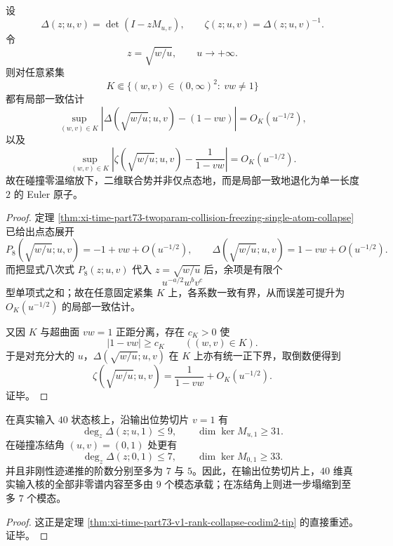 \begin{theorem}[二维联合势的局部一致原子化]\label{thm:conclusion-realinput40-twoparam-local-uniform-atomicization}
设
\[
\Delta(z;u,v)=\det(I-zM_{u,v}),
\qquad
\zeta(z;u,v)=\Delta(z;u,v)^{-1}.
\]
令
\[
z=\sqrt{w/u},
\qquad
u\to+\infty.
\]
则对任意紧集
\[
K\Subset\{(w,v)\in(0,\infty)^2:\ vw\neq 1\}
\]
都有局部一致估计
\[
\sup_{(w,v)\in K}
\left|
\Delta\!\left(\sqrt{w/u};u,v\right)-(1-vw)
\right|
=
O_K(u^{-1/2}),
\]
以及
\[
\sup_{(w,v)\in K}
\left|
\zeta\!\left(\sqrt{w/u};u,v\right)-\frac{1}{1-vw}
\right|
=
O_K(u^{-1/2}).
\]
故在碰撞零温缩放下，二维联合势并非仅点态地，而是局部一致地退化为单一长度 \(2\) 的 Euler 原子。
\end{theorem}
\begin{proof}
定理 \ref{thm:xi-time-part73-twoparam-collision-freezing-single-atom-collapse} 已给出点态展开
\[
P_8\!\left(\sqrt{w/u};u,v\right)=-1+vw+O(u^{-1/2}),
\qquad
\Delta\!\left(\sqrt{w/u};u,v\right)=1-vw+O(u^{-1/2}).
\]
而把显式八次式 \(P_8(z;u,v)\) 代入 \(z=\sqrt{w/u}\) 后，余项是有限个
\[
u^{-a/2}w^bv^c
\]
型单项式之和；故在任意固定紧集 \(K\) 上，各系数一致有界，从而误差可提升为 \(O_K(u^{-1/2})\) 的局部一致估计。

又因 \(K\) 与超曲面 \(vw=1\) 正距分离，存在 \(c_K>0\) 使
\[
|1-vw|\ge c_K
\qquad
((w,v)\in K).
\]
于是对充分大的 \(u\)，\(\Delta(\sqrt{w/u};u,v)\) 在 \(K\) 上亦有统一正下界，取倒数便得到
\[
\zeta\!\left(\sqrt{w/u};u,v\right)
=
\frac{1}{1-vw}+O_K(u^{-1/2}).
\]
证毕。
\end{proof}

\begin{theorem}[输出位势切片的九模律与碰撞冻结角的七模律]\label{thm:conclusion-realinput40-v1-nine-mode-freezecorner-seven-mode}
在真实输入 \(40\) 状态核上，沿输出位势切片 \(v=1\) 有
\[
\deg_z\Delta(z;u,1)\le 9,
\qquad
\dim\ker M_{u,1}\ge 31.
\]
在碰撞冻结角 \((u,v)=(0,1)\) 处更有
\[
\deg_z\Delta(z;0,1)\le 7,
\qquad
\dim\ker M_{0,1}\ge 33.
\]
并且非刚性迹递推的阶数分别至多为 \(7\) 与 \(5\)。因此，在输出位势切片上，\(40\) 维真实输入核的全部非零谱内容至多由 \(9\) 个模态承载；在冻结角上则进一步塌缩到至多 \(7\) 个模态。
\end{theorem}
\begin{proof}
这正是定理 \ref{thm:xi-time-part73-v1-rank-collapse-codim2-tip} 的直接重述。证毕。
\end{proof}


